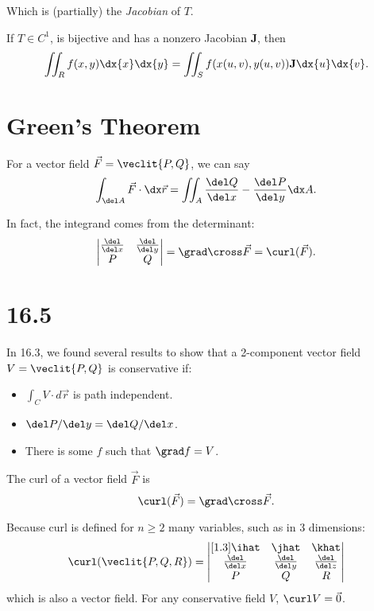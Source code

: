 \documentclass{article}
\begin{document}
Which is (partially) the \emph{Jacobian} of $T$.

\begin{theorem}
  If $T \in C^{1}$, is bijective and has a nonzero Jacobian $\mathbf{J}$, then
  \[
    \iint_{R} f(x, y) \dx{x}\dx{y} = \iint_{S} f(x(u, v), y(u, v))\mathbf{J}\dx{u}\dx{v}.
  \]
\end{theorem}

\section*{Green's Theorem}
For a vector field $\vec{F} = \veclit{P, Q}$, we can say
\[ \int_{\del A} \vec{F} \cdot \dx\vec{r} = \iint_{A} \frac{\del Q}{\del x} - \frac{\del P}{\del y} \dx A.  \]

In fact, the integrand comes from the determinant:
\[ \left|\begin{matrix}
  \frac{\del}{\del x} & \frac{\del}{\del y}\\
  P & Q
\end{matrix}\right| = \grad \cross \vec{F} = \curl(\vec{F}). \]

\section*{16.5}
In 16.3, we found several results to show that a 2-component vector field $V = \veclit{P, Q}$ is conservative if:
\begin{itemize}
  \item $\int_{C} V \cdot d\vec{r}$ is path independent.
  \item $\del P / \del y = \del Q / \del x$.
  \item There is some $f$ such that $\grad f = V$.
\end{itemize}

\begin{defn}[Curl]
  The curl of a vector field $\vec{F}$ is
  \[ \curl(\vec{F}) = \grad \cross \vec{F}. \]
\end{defn}
Because curl is defined for $n \ge 2$ many variables, such as in 3 dimensions:
\[
  \curl(\veclit{P, Q, R}) = \left|\begin{matrix}[1.3]
    \ihat & \jhat & \khat\\
    \frac{\del}{\del x} & \frac{\del}{\del y} & \frac{\del}{\del z}\\
    P & Q & R
  \end{matrix}\right|
\]
which is also a vector field. For any conservative field $V$, $\curl V = \vec{0}$.
\end{document}
